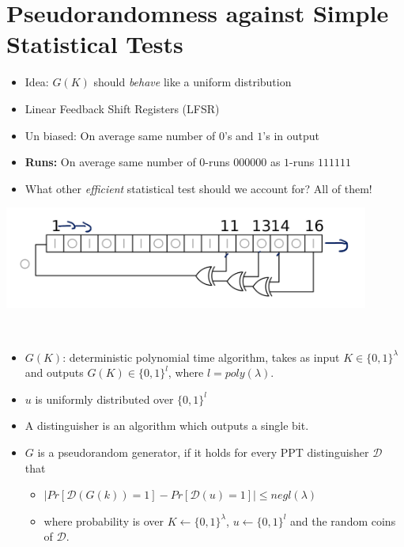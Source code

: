 	\section{Pseudorandomness against Simple Statistical Tests}
		\begin{itemize}
			\item Idea: $G(K)$ should \textit{behave} like a uniform distribution
			\item Linear Feedback Shift Registers (LFSR)
			\item Un biased: On average same number of $0$'s and $1$'s in output
			\item \textbf{Runs:} On average same number of $0$-runs $000000$ as $1$-runs $111111$
			\item What other \textit{efficient} statistical test should we account for? All of them!
		\end{itemize}
		\begin{center}
			\includegraphics[width=120mm]{Graphics/Basics of Private Key Encryption/PseudorandomnessagainstSimpleStatisticalTests.png}\newline
		\end{center}
	
	\begin{definition}\ 
	    \begin{itemize}
	        \item $G(K)$: deterministic polynomial time algorithm, takes as input $K \in \{0,1\}^{\lambda}$ and outputs $G(K) \in \{0,1\}^l$, where $l = poly(\lambda)$.
	        \item $u$ is uniformly distributed over $\{0,1\}^l$
	        \item A distinguisher is an algorithm which outputs a single bit.
	        \item $G$ is a pseudorandom generator, if it holds for every PPT distinguisher $\mathcal{D}$ that
	            \begin{itemize}
	                \item $\vert Pr[\mathcal{D}(G(k))=1]-Pr[\mathcal{D}(u)=1] \vert \leq negl(\lambda)$
	                \item where probability is over $K \leftarrow \{0,1\}^{\lambda}$, $u \leftarrow \{0,1\}^l$ and the random coins of $\mathcal{D}$.\newline
	            \end{itemize}
	    \end{itemize}
	\end{definition}
	
